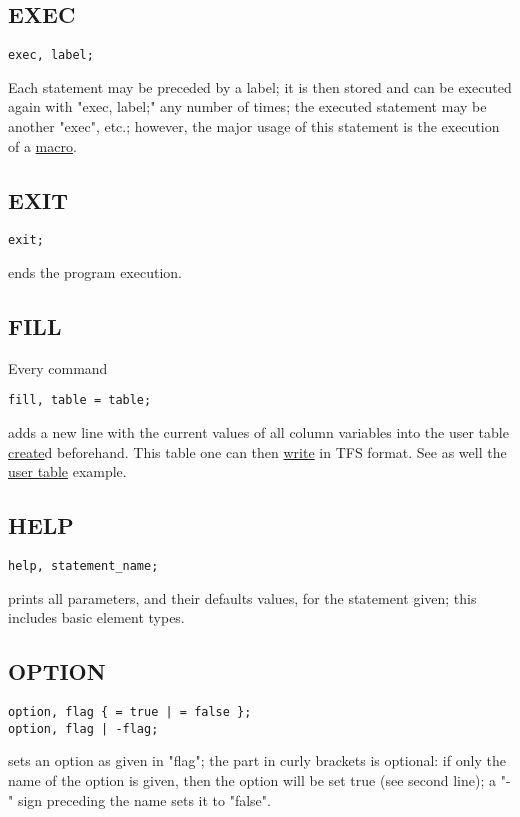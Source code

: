 \subsection{EXEC}
\begin{verbatim}
exec, label;
\end{verbatim} 
Each statement may be preceded by a label; it is then stored and can be
executed again with "exec, label;" any number of times; the executed
statement may be another "exec", etc.; however, the major usage of this
statement is the execution of a \href{special.html#macro}{macro}.  

\subsection{EXIT}
\begin{verbatim}
exit;
\end{verbatim} 
ends the program execution. 

\subsection{FILL} 
Every command 
\begin{verbatim}
fill, table = table;
\end{verbatim} 
adds a new line with the current values of all column variables into the
user table \hyperlink{create}{create}d beforehand. This table one can
then \hyperlink{write}{write} in TFS format.  See as well the
\href{../Introduction/select.html#ucreate}{user table} example.  

\subsection{HELP}
\begin{verbatim}
help, statement_name;
\end{verbatim}
prints all parameters, and their defaults values, for the statement given;
this includes basic element types.

\subsection{OPTION}
\label{subsec:general_option}
\begin{verbatim}
option, flag { = true | = false };
option, flag | -flag;
\end{verbatim} 
sets an option as given in "flag"; the part in curly brackets is
optional: if only the name of the option is given, then the option will
be set true (see second line); a "-" sign preceding the name sets it to
"false".  

